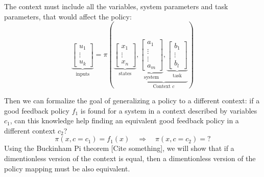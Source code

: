The context must include all the variables, system parameters and task parameters, that would affect the  policy:
\begin{equation}
\underbrace{\begin{bmatrix}
u_1 \\
\vdots \\
u_k
\end{bmatrix}}_{\text{inputs}}
=
\pi \left(
\underbrace{\begin{bmatrix}
x_1 \\
\vdots \\
x_n
\end{bmatrix}}_{\text{states}}
,
\underbrace{
\underbrace{\begin{bmatrix}
a_1 \\
\vdots \\
\vdots \\
a_m
\end{bmatrix}}_{\text{system}}
,
\underbrace{\begin{bmatrix}
b_1 \\
\vdots \\
b_l
\end{bmatrix}}_{\text{task}}
}_{\text{Context $c$}}
\right) 
\label{eq:vectorpolicy}
\end{equation}

Then we can formalize the goal of generalizing a policy to a different context: if a good feedback policy $f_1$ is found for a system in a context described by variables $c_1$, can this knowledge help finding an equivalent good feedback policy in a different context $c_2$?
\begin{equation}
\pi \left(
x,
c = c_1
\right) = 
f_1 \left(
x 
\right) 
\quad \Rightarrow \quad
\pi \left(
x,
c = c_2
\right) = ?
\end{equation}
Using the Buckinham Pi theorem [Cite something], we will show that if a dimentionless version of the context is equal, then a dimentionless version of the policy mapping must be also equivalent.




